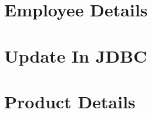 \documentclass{article}
\begin{document}
\section{Employee Details}

\newpage

\section{Update In JDBC}

\newpage

\section{Product Details}

\newpage

%
%
%
\end{document}
